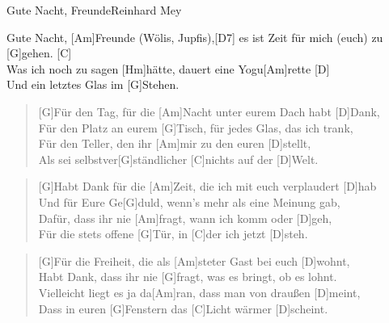 \begin{song}{Gute Nacht, Freunde}{Reinhard Mey}

    \begin{chorus}
	    [G]Gute Nacht, [Am]Freunde (Wölis, Jupfis),[D7] es ist Zeit für mich (euch) zu [G]gehen. [C] \\
        Was ich noch zu sagen [Hm]hätte, dauert eine Yogu[Am]rette [D]\\
        Und ein letztes Glas im [G]Stehen.
    \end{chorus}

    \begin{verse}  
        [G]Für den Tag, für die [Am]Nacht unter eurem Dach habt [D]Dank, \\
        Für den Platz an eurem [G]Tisch, für jedes Glas, das ich trank, \\
        Für den Teller, den ihr [Am]mir zu den euren [D]stellt, \\
        Als sei selbstver[G]ständlicher [C]nichts auf der [D]Welt.
    \end{verse}  


    \begin{verse}  
        [G]Habt Dank für die [Am]Zeit, die ich mit euch verplaudert [D]hab \\
        Und für Eure Ge[G]duld, wenn's mehr als eine Meinung gab, \\
        Dafür, dass ihr nie [Am]fragt, wann ich komm oder [D]geh, \\
        Für die stets offene [G]Tür, in [C]der ich jetzt [D]steh.
    \end{verse}  


    \begin{verse}  
        [G]Für die Freiheit, die als [Am]steter Gast bei euch [D]wohnt, \\
        Habt Dank, dass ihr nie [G]fragt, was es bringt, ob es lohnt. \\
        Vielleicht liegt es ja da[Am]ran, dass man von draußen [D]meint, \\
        Dass in euren [G]Fenstern das [C]Licht wärmer [D]scheint.
    \end{verse}  


\end{song}
